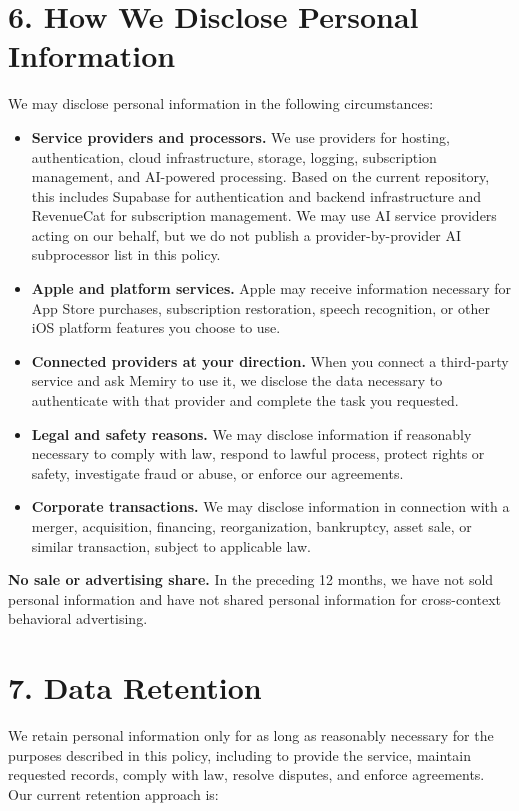 \documentclass[11pt]{article}
\newcommand{\AIVendors}{We may use AI service providers acting on our behalf, but we do not publish a provider-by-provider AI subprocessor list in this policy.}
\begin{document}
\section*{6. How We Disclose Personal Information}

We may disclose personal information in the following circumstances:

\begin{itemize}
  \item \textbf{Service providers and processors.} We use providers for hosting, authentication, cloud infrastructure, storage, logging, subscription management, and AI-powered processing. Based on the current repository, this includes Supabase for authentication and backend infrastructure and RevenueCat for subscription management. \AIVendors
  \item \textbf{Apple and platform services.} Apple may receive information necessary for App Store purchases, subscription restoration, speech recognition, or other iOS platform features you choose to use.
  \item \textbf{Connected providers at your direction.} When you connect a third-party service and ask Memiry to use it, we disclose the data necessary to authenticate with that provider and complete the task you requested.
  \item \textbf{Legal and safety reasons.} We may disclose information if reasonably necessary to comply with law, respond to lawful process, protect rights or safety, investigate fraud or abuse, or enforce our agreements.
  \item \textbf{Corporate transactions.} We may disclose information in connection with a merger, acquisition, financing, reorganization, bankruptcy, asset sale, or similar transaction, subject to applicable law.
\end{itemize}

\textbf{No sale or advertising share.} In the preceding 12 months, we have not sold personal information and have not shared personal information for cross-context behavioral advertising.

\section*{7. Data Retention}

We retain personal information only for as long as reasonably necessary for the purposes described in this policy, including to provide the service, maintain requested records, comply with law, resolve disputes, and enforce agreements. Our current retention approach is:
\end{document}
